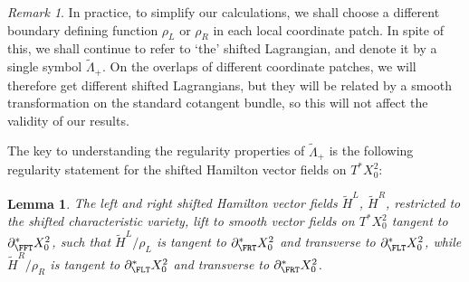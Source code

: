 \documentclass[10pt, a4paper, twoside]{amsart}
\numberwithin{equation}{section}
\newtheorem{lemma}[theorem]{Lemma}
\theoremstyle{remark}
\newtheorem{remark}[theorem]{Remark}
\begin{document}
\begin{remark} In practice, to simplify our calculations, we shall choose a different boundary defining function $\rho_L$ or $\rho_R$ in each local coordinate patch. In spite of this, we shall continue to refer to `the' shifted Lagrangian, and denote it by a single symbol ${\tilde \Lambda}_+$. On the overlaps of different coordinate patches, we will  therefore get different shifted Lagrangians, but they will be related by a smooth transformation on the standard cotangent bundle, so this will not affect the validity of our results.  
\end{remark}

The key to understanding the regularity properties of ${\tilde \Lambda}_+$ is the following regularity statement for the shifted Hamilton vector fields on $T^* X^2_0$: 

\begin{lemma}\label{lem:shifted-vf} The left and right shifted Hamilton vector fields ${\tilde H^L}$, ${\tilde H^R}$, restricted to the shifted characteristic variety, lift to smooth vector fields on $T^* X^2_0$ tangent to $\partial_\FFT^* X^2_0$, such that ${\tilde H^L}/\rho_L$ is tangent to  $\partial_\FRT^* X^2_0$ and transverse to  $\partial_\FLT^* X^2_0$, while ${\tilde H^R}/\rho_R$ is tangent to  $\partial_\FLT^* X^2_0$ and transverse to  $\partial_\FRT^* X^2_0$.
\end{lemma}
\end{document}
